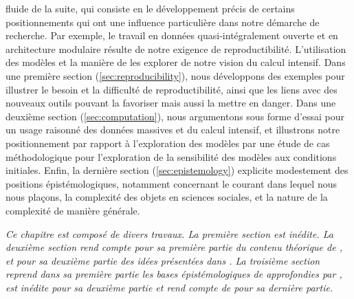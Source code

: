 fluide de la suite, qui consiste en le développement précis de certains positionnements qui ont une influence particulière dans notre démarche de recherche. Par exemple, le travail en données quasi-intégralement ouverte et en architecture modulaire résulte de notre exigence de reproductibilité. L'utilisation des modèles et la manière de les explorer de notre vision du calcul intensif. Dans une première section (\ref{sec:reproducibility}), nous développons des exemples pour illustrer le besoin et la difficulté de reproductibilité, ainsi que les liens avec des nouveaux outils pouvant la favoriser mais aussi la mettre en danger. Dans une deuxième section (\ref{sec:computation}), nous argumentons sous forme d'essai pour un usage raisonné des données massives et du calcul intensif, et illustrons notre positionnement par rapport à l'exploration des modèles par une étude de cas méthodologique pour l'exploration de la sensibilité des modèles aux conditions initiales. Enfin, la dernière section (\ref{sec:epistemology}) explicite modestement des positions épistémologiques, notamment concernant le courant dans lequel nous nous plaçons, la complexité des objets en sciences sociales, et la nature de la complexité de manière générale.




\stars


\textit{Ce chapitre est composé de divers travaux. La première section est inédite. La deuxième section rend compte pour sa première partie du contenu théorique de \cite{raimbault2016cautious}, et pour sa deuxième partie des idées présentées dans \cite{cottineau2017initial}. La troisième section reprend dans sa première partie les bases épistémologiques de \cite{raimbault:halshs-01505084} approfondies par \cite{raimbault2017knowledge}, est inédite pour sa deuxième partie et rend compte de \cite{raimbault2017complex} pour sa dernière partie.
}






